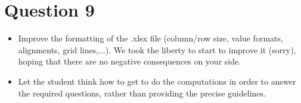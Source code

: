 \section{Question 9}
\begin{itemize}
    \item Improve the formatting of the {\ttfamily.xlsx} file (column/row size, value formats, alignments, grid lines,...). We took the liberty to start to improve it (sorry), hoping that there are no negative consequences on your side.
    \item Let the student think how to get to do the computations in order to answer the required questions, rather than providing the precise guidelines.
\end{itemize}




